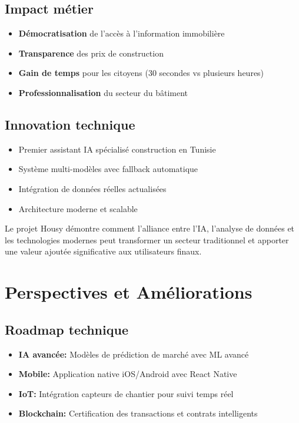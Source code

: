 \documentclass[12pt,a4paper]{report}
\begin{document}
\section*{Impact métier}

\begin{itemize}
    \item \textbf{Démocratisation} de l'accès à l'information immobilière
    \item \textbf{Transparence} des prix de construction
    \item \textbf{Gain de temps} pour les citoyens (30 secondes vs plusieurs heures)
    \item \textbf{Professionnalisation} du secteur du bâtiment
\end{itemize}

\section*{Innovation technique}

\begin{itemize}
    \item Premier assistant IA spécialisé construction en Tunisie
    \item Système multi-modèles avec fallback automatique
    \item Intégration de données réelles actualisées
    \item Architecture moderne et scalable
\end{itemize}

Le projet Housy démontre comment l'alliance entre l'IA, l'analyse de données et les technologies modernes peut transformer un secteur traditionnel et apporter une valeur ajoutée significative aux utilisateurs finaux.

\chapter*{Perspectives et Améliorations}

\section*{Roadmap technique}

\begin{itemize}
    \item \textbf{IA avancée:} Modèles de prédiction de marché avec ML avancé
    \item \textbf{Mobile:} Application native iOS/Android avec React Native
    \item \textbf{IoT:} Intégration capteurs de chantier pour suivi temps réel
    \item \textbf{Blockchain:} Certification des transactions et contrats intelligents
\end{itemize}
\end{document}
